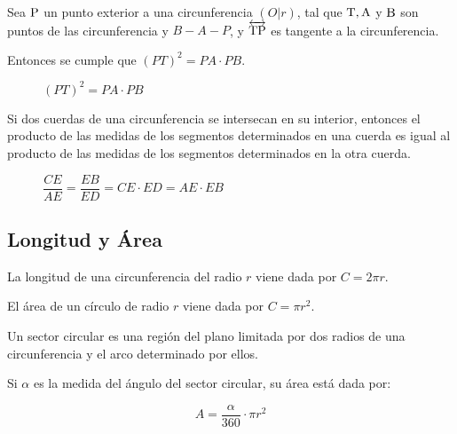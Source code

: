 \clearpage

\begin{theorem}

    Sea $\rm P$ un punto exterior a una circunferencia $(O|r)$, tal que $\rm T,A$ y $\rm B$ son puntos de las circunferencia y $B-A-P$, y $\overleftrightarrow{\rm TP}$ es tangente a la circunferencia.

    Entonces se cumple que $(PT)^2 = PA \cdot PB$.

    \begin{figure}[!h]
        \centering
        
        \caption{$(PT)^2 = PA \cdot PB$}
        \label{fig:theorem39}
    \end{figure}

\end{theorem}


\begin{theorem}

Si dos cuerdas de una circunferencia se intersecan en su interior, entonces el producto de las medidas de los segmentos determinados en una cuerda es igual al producto de las medidas de los segmentos determinados en la otra cuerda.

    \begin{figure}[!h]
        \centering
        
        \caption{$\dfrac{CE}{AE}=\dfrac{EB}{ED} = CE \cdot ED = AE \cdot EB$}
        \label{fig:theorem40}
    \end{figure}
    
\end{theorem}

\clearpage

\subsection{Longitud y Área}

\begin{theorem}
    La longitud de una circunferencia del radio $r$ viene dada por $C=2\pi r$.
\end{theorem}

\begin{theorem}
    El área de un círculo de radio $r$ viene dada por $C=\pi r^2$.
\end{theorem}

\begin{definition}
    Un sector circular es una región del plano limitada por dos radios de una circunferencia y el arco determinado por ellos.

    Si $\alpha$ es la medida del ángulo del sector circular, su área está dada por:

    $$A = \dfrac{\alpha}{360} \cdot \pi r^2$$
    
\end{definition}

